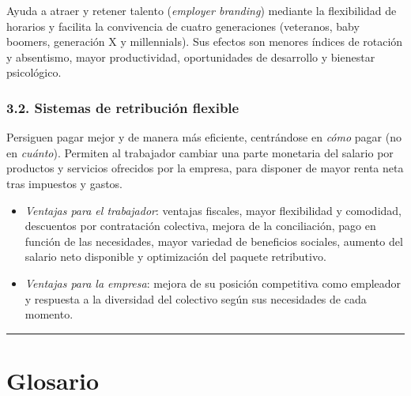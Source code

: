 \documentclass[12pt]{book} %
\providecommand{\tightlist}{%
  \setlength{\itemsep}{0pt}\setlength{\parskip}{0pt}}
\begin{document}
Ayuda a atraer y retener talento (\emph{employer branding}) mediante la
flexibilidad de horarios y facilita la convivencia de cuatro
generaciones (veteranos, baby boomers, generación X y millennials). Sus
efectos son menores índices de rotación y absentismo, mayor
productividad, oportunidades de desarrollo y bienestar psicológico.

\hypertarget{sistemas-de-retribuciuxf3n-flexible}{%
\subsection{3.2. Sistemas de retribución
flexible}\label{sistemas-de-retribuciuxf3n-flexible}}

Persiguen pagar mejor y de manera más eficiente, centrándose en
\emph{cómo} pagar (no en \emph{cuánto}). Permiten al trabajador cambiar
una parte monetaria del salario por productos y servicios ofrecidos por
la empresa, para disponer de mayor renta neta tras impuestos y gastos.

\begin{itemize}
\tightlist
\item
  \emph{Ventajas para el trabajador}: ventajas fiscales, mayor
  flexibilidad y comodidad, descuentos por contratación colectiva,
  mejora de la conciliación, pago en función de las necesidades, mayor
  variedad de beneficios sociales, aumento del salario neto disponible y
  optimización del paquete retributivo.
\item
  \emph{Ventajas para la empresa}: mejora de su posición competitiva
  como empleador y respuesta a la diversidad del colectivo según sus
  necesidades de cada momento.
\end{itemize}

\begin{center}\rule{0.5\linewidth}{0.5pt}\end{center}

\hypertarget{glosario}{%
\chapter{Glosario}\label{glosario}}
\end{document}
